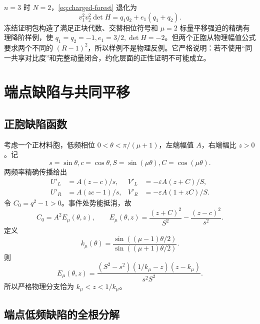 \documentclass[UTF8,12pt,openany,fontset=fandol]{ctexrep}
\theoremstyle{definition}
\begin{document}
$n=3$ 时 $N=2$，\eqref{eq:charged-forest} 退化为
\begin{equation}\label{eq:n3forest}
 v_1^2v_2^2\det H=q_1q_2+e_1(q_1+q_2).
\end{equation}
冻结证明包构造了满足正块代数、交替相位符号和 $\mu=2$ 标量平移强迫的精确有理降阶样例，使 $q_1=q_2=-1,e_1=3/2,\det H=-2$。但两个正胞从物理幅值公式要求两个不同的 $(R-1)^2$，所以样例不是物理反例。它严格说明：若不使用“同一共享对比度”和完整动量闭合，约化层面的正性证明不可能成立。

\chapter{端点缺陷与共同平移}

\section{正胞缺陷函数}

考虑一个正材料胞，低频相位 $0<\theta<\pi/(\mu+1)$，左端幅值 $A$，右端幅比 $z>0$。记
\begin{equation}
 s=\sin\theta, c=\cos\theta, S=\sin(\mu\theta), C=\cos(\mu\theta).
\end{equation}
两频率精确传播给出
\begin{align*}
 U'_L&=A(z-c)/s,&V'_L&=-\varepsilon A(z+C)/S,\\
 U'_R&=A(zc-1)/s,&V'_R&=-\varepsilon A(1+zC)/S.
\end{align*}
令 $C_0=q^2-1>0$。事件处势能抵消，故
\begin{equation}
 C_0=A^2E_\mu(\theta,z),\qquad
 E_\mu(\theta,z)=\frac{(z+C)^2}{S^2}-\frac{(z-c)^2}{s^2}.
\end{equation}
定义
\begin{equation}
 k_\mu(\theta)=\frac{\sin((\mu-1)\theta/2)}{\sin((\mu+1)\theta/2)}.
\end{equation}
则
\begin{equation}\label{eq:Efactor}
 E_\mu(\theta,z)=
 \frac{(S^2-s^2)(1/k_\mu-z)(z-k_\mu)}{s^2S^2}.
\end{equation}
所以严格物理分支恰为 $k_\mu<z<1/k_\mu$。

\section{端点低频缺陷的全根分解}
\end{document}
